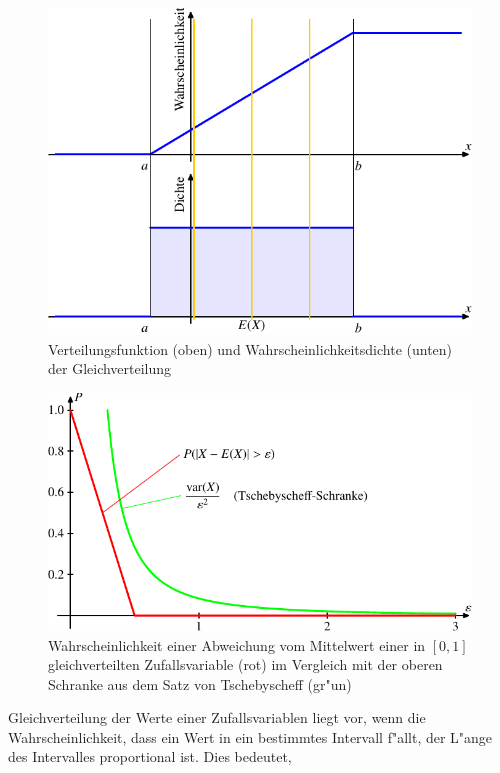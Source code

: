 \begin{figure}
\begin{center}
\includegraphics[width=0.8\hsize]{images/verteilungsfunktion-7}
\end{center}
\caption{Verteilungsfunktion (oben) und Wahrscheinlichkeitsdichte (unten)
der Gleichverteilung\label{bild-gleichverteilung}}
\end{figure}
\begin{figure}
\begin{center}
\includegraphics{images/gl-1.pdf}
\end{center}
\caption{Wahrscheinlichkeit einer Abweichung vom Mittelwert einer
in $[0,1]$ gleichverteilten Zufallsvariable (rot) im Vergleich mit
der oberen Schranke aus dem Satz von Tschebyscheff (gr"un)
\label{bild-gleichverteilung-wahrscheinlichkeit}} %
\end{figure}
Gleichverteilung der Werte einer Zufallsvariablen liegt vor, wenn
die Wahrscheinlichkeit, dass ein Wert in ein bestimmtes Intervall
f"allt, der L"ange des Intervalles proportional ist. Dies bedeutet,
